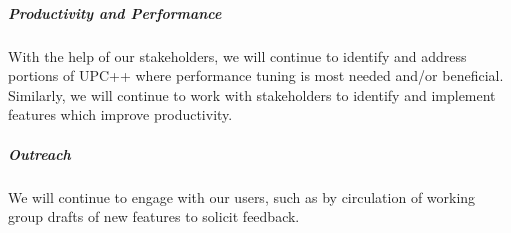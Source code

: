 \subparagraph{Productivity and Performance}
With the help of our stakeholders, we will continue to identify and address
portions of UPC++ where performance tuning is most needed
and/or beneficial.  Similarly, we will continue to work with stakeholders to
identify and implement features which improve productivity.

\subparagraph{Outreach}
We will continue to engage with our users, such as by circulation of working
group drafts of new features to solicit feedback.
